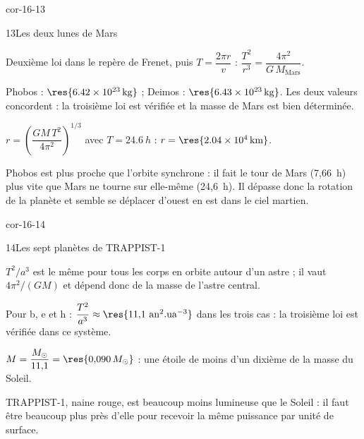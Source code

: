 \begin{blocLivre}{cor-16-13}
\begin{corrige}{13}{Les deux lunes de Mars}
\begin{questions}
\item Deuxième loi dans le repère de Frenet, puis $T=\dfrac{2\pi r}{v}$ : $\dfrac{T^2}{r^3}=\dfrac{4\pi^2}{G\,M_\mathrm{Mars}}$.
\item Phobos : $\res{\qty{6,42e23}{kg}}$ ; Deimos : $\res{\qty{6,43e23}{kg}}$. Les deux valeurs concordent : la troisième loi est
vérifiée et la masse de Mars est bien déterminée.
\item $r=\left(\dfrac{GM\,T^2}{4\pi^2}\right)^{1/3}$ avec $T=\qty{24,6}{h}$ : $r=\res{\qty{2,04e4}{km}}$.
\item Phobos est plus proche que l'orbite synchrone : il fait le tour de Mars (7,66~h) plus vite que Mars ne tourne sur
elle-même (24,6~h). Il dépasse donc la rotation de la planète et semble se déplacer d'ouest en est dans le ciel martien.
\end{questions}
\end{corrige}
\end{blocLivre}
\begin{blocLivre}{cor-16-14}
\begin{corrige}{14}{Les sept planètes de TRAPPIST-1}
\begin{questions}
\item $T^2/a^3$ est le même pour tous les corps en orbite autour d'un astre ; il vaut $4\pi^2/(GM)$ et dépend donc de la
masse de l'astre central.
\item Pour b, e et h : $\dfrac{T^2}{a^3}\approx\res{11{,}1~\text{an}^2.\text{ua}^{-3}}$ dans les trois cas : la troisième loi est
vérifiée dans ce système.
\item $M=\dfrac{M_\odot}{11{,}1}=\res{0{,}090\,M_\odot}$ : une étoile de moins d'un dixième de la masse du Soleil.
\item TRAPPIST-1, naine rouge, est beaucoup moins lumineuse que le Soleil : il faut être beaucoup plus près d'elle pour
recevoir la même puissance par unité de surface.
\end{questions}
\end{corrige}
\end{blocLivre}
